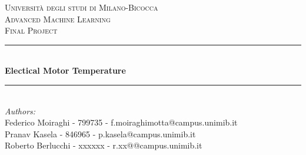\begin{titlepage}

\newcommand{\HRule}{\rule{\linewidth}{0.5mm}} %

\center %
 

\textsc{\LARGE Università degli studi di Milano-Bicocca}\\[1cm] %
\textsc{\Large Advanced Machine Learning }\\[0.3cm] %
\textsc{\large Final Project}\\[0.1cm] %


\HRule \\[0.4cm]
{ \huge \bfseries Electical Motor Temperature}\\[0.2cm] %
\HRule \\[1.5cm]
 

\large
\emph{Authors:}\\
Federico Moiraghi - 799735 - f.moiraghimotta@campus.unimib.it \\
Pranav Kasela - 846965 - p.kasela@campus.unimib.it \\
Roberto Berlucchi - xxxxxx - r.xx@@campus.unimib.it \\
[0.5cm] %




\end{titlepage}
